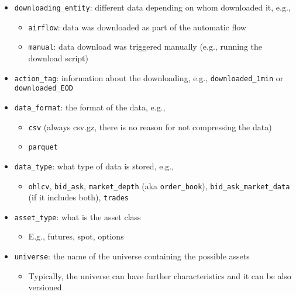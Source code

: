 \documentclass[11pt, reqno]{amsart}
\theoremstyle{definition}
\theoremstyle{remark}
\begin{document}
\begin{itemize}
    \item \verb|downloading_entity|: different data depending on whom downloaded
      it, e.g.,

      \begin{itemize}
        \item \verb|airflow|: data was downloaded as part of the automatic flow

        \item \verb|manual|: data download was triggered manually (e.g., running
          the download script)
      \end{itemize}

    \item \verb|action_tag|: information about the downloading, e.g., \verb|downloaded_1min|
      or \verb|downloaded_EOD|

    \item \verb|data_format|: the format of the data, e.g.,

      \begin{itemize}
        \item \verb|csv| (always csv.gz, there is no reason for not compressing the
          data)

        \item \verb|parquet|
      \end{itemize}

    \item \verb|data_type|: what type of data is stored, e.g.,

      \begin{itemize}
        \item \verb|ohlcv|, \verb|bid_ask|, \verb|market_depth| (aka
          \verb|order_book|), \verb|bid_ask_market_data| (if it includes both), \verb|trades|
      \end{itemize}

    \item \verb|asset_type|: what is the asset class

      \begin{itemize}
        \item E.g., futures, spot, options
      \end{itemize}

    \item \verb|universe|: the name of the universe containing the possible
      assets

      \begin{itemize}
        \item Typically, the universe can have further characteristics and it
          can be also versioned


\end{itemize}
\end{itemize}
\end{document}
